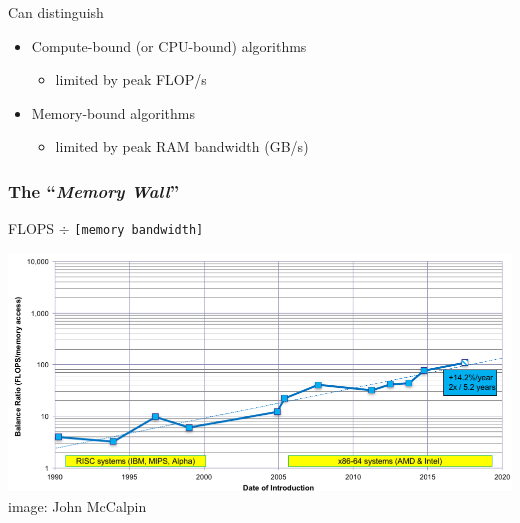 \documentclass[xcolor={x11names,svgnames}]{beamer}
\begin{document}
\begin{frame}
\bigskip

\begin{block}{Can distinguish}
\begin{itemize}
\item \alert{Compute-bound} {\small (or CPU-bound)} algorithms
  \begin{itemize}
  \item limited by peak FLOP/s
  \end{itemize}
  \medskip
  
\item \alert{Memory-bound} algorithms
  \begin{itemize}
  \item limited by peak RAM bandwidth (GB/s)
  \end{itemize}
\end{itemize}
\end{block}

\end{frame}


\begin{frame}
  \frametitle{The ``\emph{Memory Wall}''}

  \begin{center}
    \large FLOPS $\div$ \texttt{[memory bandwidth]}
  \end{center}

  \bigskip
  
  \includegraphics[width=\textwidth]{calpin_wall_bw.png}
  \flushright image: John McCalpin
\end{frame}

\end{document}

